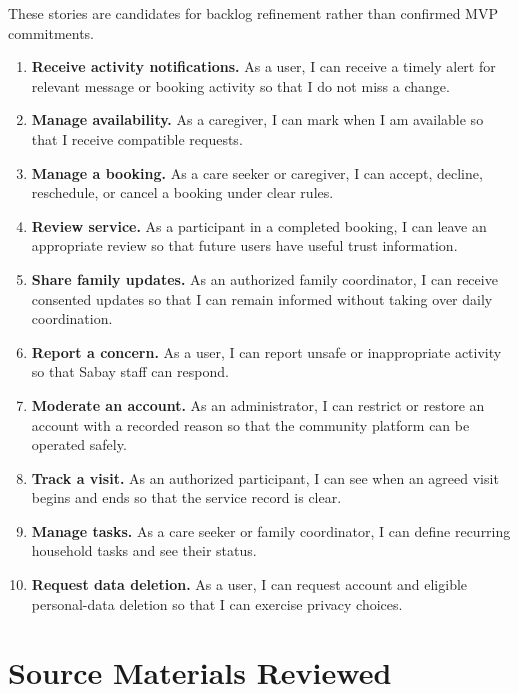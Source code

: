 \documentclass[11pt]{article}
\begin{document}
These stories are candidates for backlog refinement rather than confirmed MVP commitments.

\begin{enumerate}
  \item \textbf{Receive activity notifications.} As a user, I can receive a timely alert for relevant message or booking activity so that I do not miss a change.
  \item \textbf{Manage availability.} As a caregiver, I can mark when I am available so that I receive compatible requests.
  \item \textbf{Manage a booking.} As a care seeker or caregiver, I can accept, decline, reschedule, or cancel a booking under clear rules.
  \item \textbf{Review service.} As a participant in a completed booking, I can leave an appropriate review so that future users have useful trust information.
  \item \textbf{Share family updates.} As an authorized family coordinator, I can receive consented updates so that I can remain informed without taking over daily coordination.
  \item \textbf{Report a concern.} As a user, I can report unsafe or inappropriate activity so that Sabay staff can respond.
  \item \textbf{Moderate an account.} As an administrator, I can restrict or restore an account with a recorded reason so that the community platform can be operated safely.
  \item \textbf{Track a visit.} As an authorized participant, I can see when an agreed visit begins and ends so that the service record is clear.
  \item \textbf{Manage tasks.} As a care seeker or family coordinator, I can define recurring household tasks and see their status.
  \item \textbf{Request data deletion.} As a user, I can request account and eligible personal-data deletion so that I can exercise privacy choices.
\end{enumerate}

\section{Source Materials Reviewed}
\end{document}
